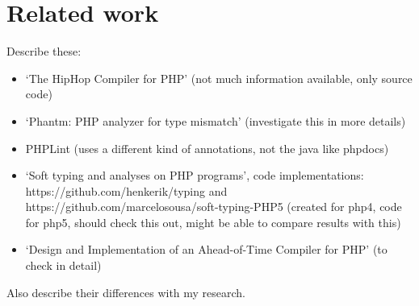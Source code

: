\documentclass[../main.tex]{subfiles}
\begin{document}
    \section{Related work}
    Describe these:
    \begin{itemize}
        \item `The HipHop Compiler for PHP'\cite{Zhao:12} (not much information available, only source code)
        \item `Phantm: PHP analyzer for type mismatch'\cite{Kne:10,Bar:10} (investigate this in more details)
        \item PHPLint \footnotemark (uses a different kind of annotations, not the java like phpdocs)
        \item `Soft typing and analyses on PHP programs'\cite{}, code implementations: https://github.com/henkerik/typing and https://github.com/marcelosousa/soft-typing-PHP5 (created for php4, code for php5, should check this out, might be able to compare results with this)
        \item `Design and Implementation of an Ahead-of-Time Compiler for PHP'\cite{Big:10} (to check in detail)
    \end{itemize}
    Also describe their differences with my research.
    
\end{document}
